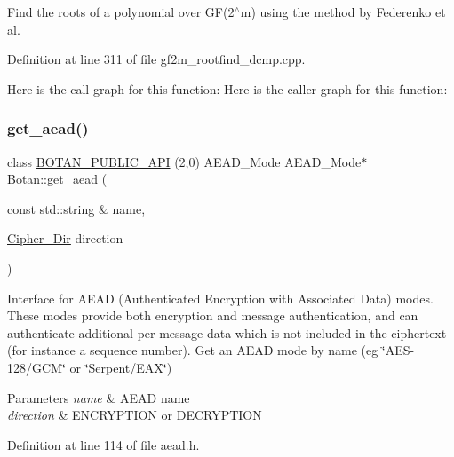 Find the roots of a polynomial over G\+F(2$^\wedge$m) using the method by Federenko et al. 

Definition at line 311 of file gf2m\+\_\+rootfind\+\_\+dcmp.\+cpp.

Here is the call graph for this function\+:
Here is the caller graph for this function\+:
\mbox{\label{namespace_botan_a22646ab3e050b0bf8f3ec55184c467c6}} 
\subsubsection{\texorpdfstring{get\+\_\+aead()}{get\_aead()}}
{\footnotesize\ttfamily class \mbox{\hyperlink{namespace_botan_a6b9388030d872e586a4655b776ac9501}{B\+O\+T\+A\+N\+\_\+\+P\+U\+B\+L\+I\+C\+\_\+\+A\+PI}} (2,0) A\+E\+A\+D\+\_\+\+Mode A\+E\+A\+D\+\_\+\+Mode$\ast$ Botan\+::get\+\_\+aead (\begin{DoxyParamCaption}\item[{const std\+::string \&}]{name,  }\item[{\mbox{\hyperlink{namespace_botan_a8d9547a8fb3e868810b169b20ac389ee}{Cipher\+\_\+\+Dir}}}]{direction }\end{DoxyParamCaption})\hspace{0.3cm}{\ttfamily [inline]}}

Interface for A\+E\+AD (Authenticated Encryption with Associated Data) modes. These modes provide both encryption and message authentication, and can authenticate additional per-\/message data which is not included in the ciphertext (for instance a sequence number). Get an A\+E\+AD mode by name (eg \char`\"{}\+A\+E\+S-\/128/\+G\+C\+M\char`\"{} or \char`\"{}\+Serpent/\+E\+A\+X\char`\"{}) 
\begin{DoxyParams}{Parameters}
{\em name} & A\+E\+AD name \\
\hline
{\em direction} & E\+N\+C\+R\+Y\+P\+T\+I\+ON or D\+E\+C\+R\+Y\+P\+T\+I\+ON \\
\hline
\end{DoxyParams}


Definition at line 114 of file aead.\+h.

\mbox{\label{namespace_botan_ac22e1d5609dbde74a5f45f729f4c4c6a}} 

